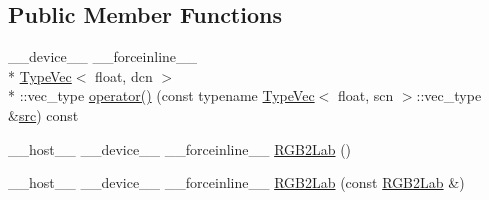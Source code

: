 \subsection*{Public Member Functions}
\begin{DoxyCompactItemize}
\item 
\-\_\-\-\_\-device\-\_\-\-\_\- \-\_\-\-\_\-forceinline\-\_\-\-\_\- \\*
\hyperlink{structcv_1_1gpu_1_1device_1_1TypeVec}{Type\-Vec}$<$ float, dcn $>$\\*
\-::vec\-\_\-type \hyperlink{structcv_1_1gpu_1_1device_1_1color__detail_1_1RGB2Lab_3_01float_00_01scn_00_01dcn_00_01srgb_00_01blueIdx_01_4_acb5d775546784e807a7cb2a76de5c0ff}{operator()} (const typename \hyperlink{structcv_1_1gpu_1_1device_1_1TypeVec}{Type\-Vec}$<$ float, scn $>$\-::vec\-\_\-type \&\hyperlink{legacy_8hpp_a371cd109b74033bc4366f584edd3dacc}{src}) const 
\item 
\-\_\-\-\_\-host\-\_\-\-\_\- \-\_\-\-\_\-device\-\_\-\-\_\- \-\_\-\-\_\-forceinline\-\_\-\-\_\- \hyperlink{structcv_1_1gpu_1_1device_1_1color__detail_1_1RGB2Lab_3_01float_00_01scn_00_01dcn_00_01srgb_00_01blueIdx_01_4_aa60411bcd841f0d6f2fa1c5de7863b9a}{R\-G\-B2\-Lab} ()
\item 
\-\_\-\-\_\-host\-\_\-\-\_\- \-\_\-\-\_\-device\-\_\-\-\_\- \-\_\-\-\_\-forceinline\-\_\-\-\_\- \hyperlink{structcv_1_1gpu_1_1device_1_1color__detail_1_1RGB2Lab_3_01float_00_01scn_00_01dcn_00_01srgb_00_01blueIdx_01_4_a322fda7c016d99a54fd193e26cecf875}{R\-G\-B2\-Lab} (const \hyperlink{structcv_1_1gpu_1_1device_1_1color__detail_1_1RGB2Lab}{R\-G\-B2\-Lab} \&)
\end{DoxyCompactItemize}


